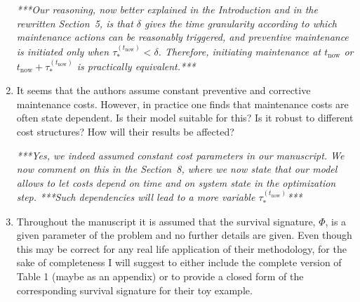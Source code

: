 \documentclass[authoryear]{elsarticle}
\def\tnow{t_\text{now}}
\newcommand{\tausnow}{\tau_*^{(\tnow)}}
\begin{document}
\begin{enumerate}
\smallskip

\emph{***Our reasoning, now better explained in the Introduction and in the rewritten Section~5,
is that $\delta$ gives the time granularity according to which maintenance actions can be reasonably triggered,
and preventive maintenance is initiated only when $\tausnow < \delta$.
Therefore, initiating maintenance at $\tnow$ or $\tnow + \tausnow$ is practically equivalent.***}

\item It seems that the authors assume constant preventive and corrective maintenance costs. However, in practice one finds that maintenance costs are often state dependent. Is their model suitable for this? Is it robust to different cost structures? How will their results be affected?

\smallskip

\emph{***Yes, we indeed assumed constant cost parameters in our manuscript.
We now comment on this in the Section~8, where we now state that our model allows
to let costs depend on time and on system state in the optimization step.
***Such dependencies will lead to a more variable $\tausnow$***
}

\item Throughout the manuscript it is assumed that the survival signature, $\Phi$, is a given parameter of the problem and no further details are given. Even though this may be correct for any real life application of their methodology, for the sake of completeness I will suggest to either include the complete version of Table 1 (maybe as an appendix) or to provide a closed form of the corresponding survival signature for their toy example.

\smallskip


\end{enumerate}
\end{document}
